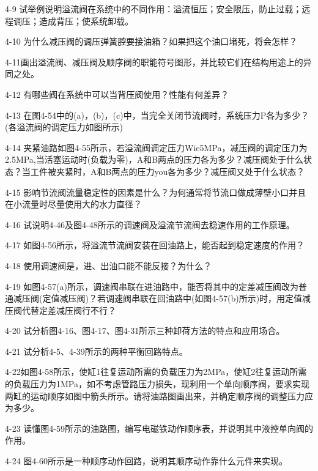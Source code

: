 	4-9 试举例说明溢流阀在系统中的不同作用：溢流恒压；安全限压，防止过载；远程调压；造成背压；使系统卸载。
	
	4-10 为什么减压阀的调压弹簧腔要接油箱？如果把这个油口堵死，将会怎样？
	
	4-11画出溢流阀、减压阀及顺序阀的职能符号图形，并比较它们在结构用途上的异同之处。
	
	4-12 有哪些阀在系统中可以当背压阀使用？性能有何差异？
	
	4-13 在图4-54中的(a)，(b)，(c)中，当完全关闭节流阀时，系统压力P各为多少？(各溢流阀的调定压力如图所示)
	
	4-14 夹紧油路如图4-55所示，若溢流阀调定压力Wie5MPa，减压阀的调定压力为2.5MPa,当活塞运动时(负载为零)，A和B两点的压力各为多少？减压阀处于什么状态？当工件被夹紧时，A和B两点的压力you各为多少？减压阀又处于什么状态？
	
	4-15 影响节流阀流量稳定性的因素是什么？为何通常将节流口做成薄壁小口并且在小流量时尽量使用大的水力直径？
	
	4-16 试说明4-46及图4-48所示的调速阀及溢流节流阀去稳速作用的工作原理。
	
	4-17 如图4-56所示，将溢流节流阀安装在回油路上，能否起到稳定速度的作用？
	
	4-18 使用调速阀是，进、出油口能不能反接？为什么？
	
	4-19 如图4-57(a)所示，调速阀串联在进油路中，能否将其中的定差减压阀改为普通减压阀(定值减压阀)？若调速阀串联在回油路中(如图4-57(b)所示)时，用定值减压阀代替定差减压阀行不行？
	
	4-20 试分析图4-16、图4-17、图4-31所示三种卸荷方法的特点和应用场合。
	
	4-21 试分析4-5、4-39所示的两种平衡回路特点。
	
	4-22如图4-58所示，使缸1往复运动所需的负载压力为2MPa，使缸2往复运动所需的负载压力为1MPa，如不考虑管路压力损失，现利用一个单向顺序阀，要求实现两缸的运动顺序如图中箭头所示。请将油路图画出来，并确定顺序阀的调整压力应为多少。
	
	4-23 读懂图4-59所示的油路图，编写电磁铁动作顺序表，并说明其中液控单向阀的作用。
	
	4-24 图4-60所示是一种顺序动作回路，说明其顺序动作靠什么元件来实现。

